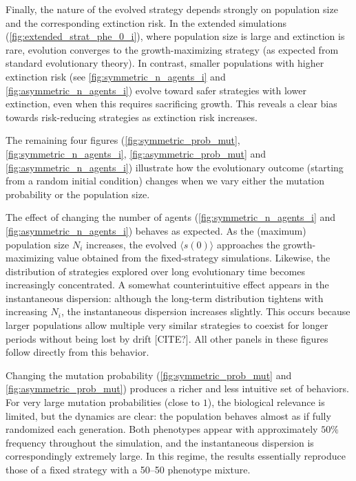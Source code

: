 \documentclass[a4paper,10pt,twocolumn]{article}
\begin{document}
Finally, the nature of the evolved strategy depends strongly on population size and the corresponding extinction risk. In the extended simulations (\autoref{fig:extended_strat_phe_0_i}), where population size is large and extinction is rare, evolution converges to the growth-maximizing strategy (as expected from standard evolutionary theory). In contrast, smaller populations with higher extinction risk (see \autoref{fig:symmetric_n_agents_i} and \autoref{fig:asymmetric_n_agents_i}) evolve toward safer strategies with lower extinction, even when this requires sacrificing growth. This reveals a clear bias towards risk-reducing strategies as extinction risk increases.

The remaining four figures (\autoref{fig:symmetric_prob_mut}, \autoref{fig:symmetric_n_agents_i}, \autoref{fig:asymmetric_prob_mut} and \autoref{fig:asymmetric_n_agents_i}) illustrate how the evolutionary outcome (starting from a random initial condition) changes when we vary either the mutation probability or the population size.

The effect of changing the number of agents (\autoref{fig:symmetric_n_agents_i} and \autoref{fig:asymmetric_n_agents_i}) behaves as expected. As the (maximum) population size $N_i$ increases, the evolved $\langle s(0)\rangle$ approaches the growth-maximizing value obtained from the fixed-strategy simulations. Likewise, the distribution of strategies explored over long evolutionary time becomes increasingly concentrated. A somewhat counterintuitive effect appears in the instantaneous dispersion: although the long-term distribution tightens with increasing $N_i$, the instantaneous dispersion increases slightly. This occurs because larger populations allow multiple very similar strategies to coexist for longer periods without being lost by drift [CITE?]. All other panels in these figures follow directly from this behavior.

Changing the mutation probability (\autoref{fig:symmetric_prob_mut} and \autoref{fig:asymmetric_prob_mut}) produces a richer and less intuitive set of behaviors. For very large mutation probabilities (close to $1$), the biological relevance is limited, but the dynamics are clear: the population behaves almost as if fully randomized each generation. Both phenotypes appear with approximately $50\%$ frequency throughout the simulation, and the instantaneous dispersion is correspondingly extremely large. In this regime, the results essentially reproduce those of a fixed strategy with a 50--50 phenotype mixture.
\end{document}
